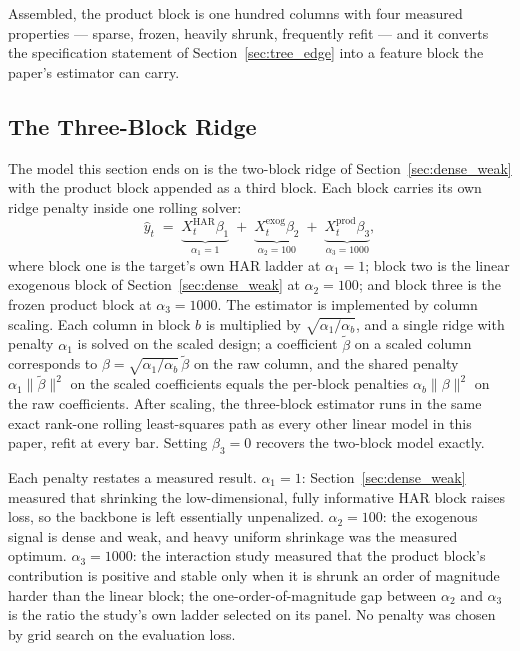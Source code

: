 Assembled, the product block is one hundred columns with four measured
properties --- sparse, frozen, heavily shrunk, frequently refit --- and it
converts the specification statement of Section~\ref{sec:tree_edge} into a
feature block the paper's estimator can carry.

\subsection{The Three-Block Ridge}
\label{sec:three_block}

The model this section ends on is the two-block ridge of
Section~\ref{sec:dense_weak} with the product block appended as a third
block. Each block carries its own ridge penalty inside one rolling solver:
\begin{equation}
    \hat{y}_t \;=\;
    \underbrace{X^{\mathrm{HAR}}_t \beta_1}_{\alpha_1 = 1}
    \;+\;
    \underbrace{X^{\mathrm{exog}}_t \beta_2}_{\alpha_2 = 100}
    \;+\;
    \underbrace{X^{\mathrm{prod}}_t \beta_3}_{\alpha_3 = 1000},
    \label{eq:three_block}
\end{equation}
where block one is the target's own HAR ladder at $\alpha_1 = 1$; block two
is the linear exogenous block of Section~\ref{sec:dense_weak} at
$\alpha_2 = 100$; and block three is the frozen product block at
$\alpha_3 = 1000$. The estimator is implemented by column scaling. Each
column in block $b$ is multiplied by $\sqrt{\alpha_1/\alpha_b}$, and a
single ridge with penalty $\alpha_1$ is solved on the scaled design; a
coefficient $\tilde{\beta}$ on a scaled column corresponds to
$\beta = \sqrt{\alpha_1/\alpha_b}\,\tilde{\beta}$ on the raw column, and
the shared penalty $\alpha_1 \|\tilde{\beta}\|^2$ on the scaled
coefficients equals the per-block penalties $\alpha_b \|\beta\|^2$ on the
raw coefficients. After scaling, the three-block estimator runs in the same
exact rank-one rolling least-squares path as every other linear model in
this paper, refit at every bar. Setting $\beta_3 = 0$ recovers the
two-block model exactly.

Each penalty restates a measured result. $\alpha_1 = 1$:
Section~\ref{sec:dense_weak} measured that shrinking the low-dimensional,
fully informative HAR block raises loss, so the backbone is left
essentially unpenalized. $\alpha_2 = 100$: the exogenous signal is dense
and weak, and heavy uniform shrinkage was the measured optimum.
$\alpha_3 = 1000$: the interaction study measured that the product block's
contribution is positive and stable only when it is shrunk an order of
magnitude harder than the linear block; the one-order-of-magnitude gap
between $\alpha_2$ and $\alpha_3$ is the ratio the study's own ladder
selected on its panel. No penalty was chosen by grid search on the
evaluation loss.

